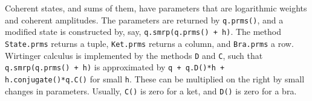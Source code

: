 Coherent states, and sums of them, have parameters that are logarithmic weights and coherent amplitudes.  The parameters are returned by {\tt q.prms()}, and a modified state is constructed by, say, {\tt q.smrp(q.prms() + h)}.  The method {\tt State.prms} returns a tuple, {\tt Ket.prms} returns a column, and {\tt Bra.prms} a row.  Wirtinger calculus is implemented by the methods {\tt D} and {\tt C}, such that {\tt q.smrp(q.prms() + h)} is approximated by {\tt q + q.D()*h + h.conjugate()*q.C()} for small {\tt h}.  These can be multiplied on the right by small changes in parameters.  Usually, {\tt C()} is zero for a ket, and {\tt D()} is zero for a bra.

\bye